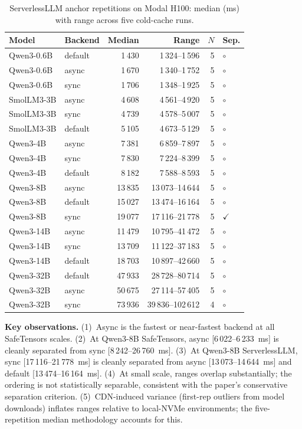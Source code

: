 \begin{table}[htbp]
\centering
\small
\caption{ServerlessLLM anchor repetitions on Modal H100: median (ms) with range across five cold-cache runs.}
\label{tab:anchor-serverlessllm}
\begin{tabular}{llrrrl}
\toprule
Model & Backend & Median & Range & $N$ & Sep. \\
\midrule
Qwen3-0.6B & default & 1\,430 & 1\,324--1\,596 & 5 & $\circ$ \\
Qwen3-0.6B & async & 1\,670 & 1\,340--1\,752 & 5 & $\circ$ \\
Qwen3-0.6B & sync & 1\,706 & 1\,348--1\,925 & 5 & $\circ$ \\
\midrule
SmolLM3-3B & async & 4\,608 & 4\,561--4\,920 & 5 & $\circ$ \\
SmolLM3-3B & sync & 4\,739 & 4\,578--5\,007 & 5 & $\circ$ \\
SmolLM3-3B & default & 5\,105 & 4\,673--5\,129 & 5 & $\circ$ \\
\midrule
Qwen3-4B & async & 7\,381 & 6\,859--7\,897 & 5 & $\circ$ \\
Qwen3-4B & sync & 7\,830 & 7\,224--8\,399 & 5 & $\circ$ \\
Qwen3-4B & default & 8\,182 & 7\,588--8\,593 & 5 & $\circ$ \\
\midrule
Qwen3-8B & async & 13\,835 & 13\,073--14\,644 & 5 & $\circ$ \\
Qwen3-8B & default & 15\,027 & 13\,474--16\,164 & 5 & $\circ$ \\
Qwen3-8B & sync & 19\,077 & 17\,116--21\,778 & 5 & $\checkmark$ \\
\midrule
Qwen3-14B & async & 11\,479 & 10\,795--41\,472 & 5 & $\circ$ \\
Qwen3-14B & sync & 13\,709 & 11\,122--37\,183 & 5 & $\circ$ \\
Qwen3-14B & default & 18\,703 & 10\,897--42\,660 & 5 & $\circ$ \\
\midrule
Qwen3-32B & default & 47\,933 & 28\,728--80\,714 & 5 & $\circ$ \\
Qwen3-32B & async & 50\,675 & 27\,114--57\,405 & 5 & $\circ$ \\
Qwen3-32B & sync & 73\,936 & 39\,836--102\,612 & 4 & $\circ$ \\
\bottomrule
\end{tabular}
\end{table}

\textbf{Key observations.} (1)~Async is the fastest or near-fastest backend at all SafeTensors scales. (2)~At Qwen3-8B SafeTensors, async [6\,022--6\,233~ms] is cleanly separated from sync [8\,242--26\,760~ms]. (3)~At Qwen3-8B ServerlessLLM, sync [17\,116--21\,778~ms] is cleanly separated from async [13\,073--14\,644~ms] and default [13\,474--16\,164~ms]. (4)~At small scale, ranges overlap substantially; the ordering is not statistically separable, consistent with the paper's conservative separation criterion. (5)~CDN-induced variance (first-rep outliers from model downloads) inflates ranges relative to local-NVMe environments; the five-repetition median methodology accounts for this.

